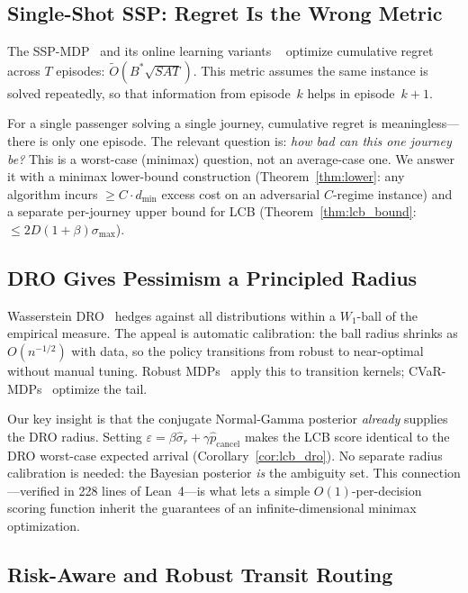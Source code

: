 \documentclass[11pt]{article}
\theoremstyle{definition}
\theoremstyle{remark}
\begin{document}
\subsection{Single-Shot SSP: Regret Is the Wrong Metric}

The SSP-MDP~\cite{bertsekas1991} and its online learning variants
~\cite{rosenberg2020,cohen2021} optimize cumulative regret across
$T$ episodes: $\tilde{O}(B^*\!\sqrt{SAT})$.
This metric assumes the same instance is solved repeatedly, so that
information from episode~$k$ helps in episode~$k{+}1$.

For a single passenger solving a single journey, cumulative regret
is meaningless---there is only one episode.
The relevant question is: \emph{how bad can this one journey be?}
This is a worst-case (minimax) question, not an average-case one.
We answer it with a minimax lower-bound construction
(Theorem~\ref{thm:lower}: any algorithm incurs $\geq C \cdot
d_{\min}$ excess cost on an adversarial $C$-regime instance) and a
separate per-journey upper bound for LCB
(Theorem~\ref{thm:lcb_bound}: $\leq 2D(1{+}\beta)\sigma_{\max}$).

\subsection{DRO Gives Pessimism a Principled Radius}

Wasserstein DRO~\cite{blanchet2019,esfahani2018} hedges against
all distributions within a $W_1$-ball of the empirical measure.
The appeal is automatic calibration: the ball radius shrinks as
$O(n^{-1/2})$ with data, so the policy transitions from robust
to near-optimal without manual tuning.
Robust MDPs~\cite{nilim2005,iyengar2005} apply this to transition
kernels; CVaR-MDPs~\cite{chow2015} optimize the tail.

Our key insight is that the conjugate Normal-Gamma posterior
\emph{already} supplies the DRO radius.
Setting $\varepsilon = \beta\hat\sigma_r + \gamma\hat{p}_{\mathrm{cancel}}$
makes the LCB score identical to the DRO worst-case expected arrival
(Corollary~\ref{cor:lcb_dro}).
No separate radius calibration is needed: the Bayesian posterior
\emph{is} the ambiguity set.
This connection---verified in 228 lines of Lean~4---is what lets a
simple $O(1)$-per-decision scoring function inherit the guarantees
of an infinite-dimensional minimax optimization.

\subsection{Risk-Aware and Robust Transit Routing}
\end{document}

